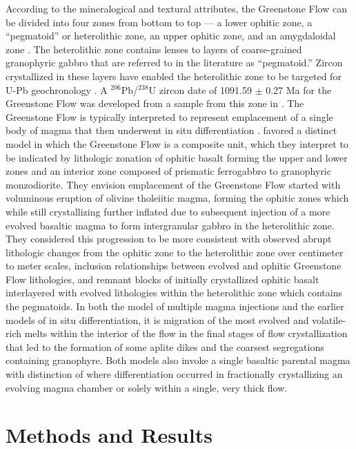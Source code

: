 According to the mineralogical and textural attributes, the Greenstone Flow can be divided into four zones from bottom to top --- a lower ophitic zone, a ``pegmatoid'' or heterolithic zone, an upper ophitic zone, and an amygdaloidal zone \citep{Cornwall1951b}. The heterolithic zone contains lenses to layers of coarse-grained granophyric gabbro that are referred to in the literature as ``pegmatoid.'' Zircon crystallized in these layers have enabled the heterolithic zone to be targeted for U-Pb geochronology \citep{Davis1990a, Swanson-Hysell2019a}. A $^{206}$Pb/$^{238}$U zircon date of 1091.59 $\pm$ 0.27 Ma for the Greenstone Flow was developed from a sample from this zone in \cite{Swanson-Hysell2019a}. The Greenstone Flow is typically interpreted to represent emplacement of a single body of magma that then underwent in situ differentiation \citep{Huber1973a, Davis1990a}.  favored a distinct model in which the Greenstone Flow is a composite unit, which they interpret to be indicated by lithologic zonation of ophitic basalt forming the upper and lower zones and an interior zone composed of prismatic ferrogabbro to granophyric monzodiorite. They envision emplacement of the Greenstone Flow started with voluminous eruption of olivine tholeiitic magma, forming the ophitic zones which while still crystallizing further inflated due to subsequent injection of a more evolved basaltic magma to form intergranular gabbro in the heterolithic zone. They considered this progression to be more consistent with observed abrupt lithologic changes from the ophitic zone to the heterolithic zone over centimeter to meter scales, inclusion relationships between evolved and ophitic Greenstone Flow lithologies, and remnant blocks of initially crystallized ophitic basalt interlayered with evolved lithologies within the heterolithic zone which contains the pegmatoids. In both the \cite{Doyle2016a} model of multiple magma injections and the earlier models of in situ differentiation, it is migration of the most evolved and volatile-rich melts within the interior of the flow in the final stages of flow crystallization that led to the formation of some aplite dikes and the coarsest segregations containing granophyre. Both models also invoke a single basaltic parental magma with distinction of where differentiation occurred in fractionally crystallizing an evolving magma chamber or solely within a single, very thick flow.

\section{Methods and Results}

